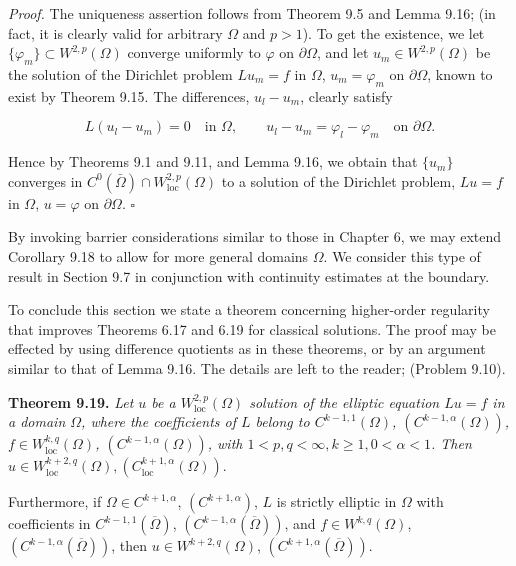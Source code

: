 \textit{Proof.} The uniqueness assertion follows from Theorem 9.5 and Lemma 9.16; (in fact, it is clearly valid for arbitrary $\Omega$ and $p > 1$). To get the existence, we let $\{\varphi_m\} \subset W^{2,p}(\Omega)$ converge uniformly to $\varphi$ on $\partial\Omega$, and let $u_m \in W^{2,p}(\Omega)$ be the solution of the Dirichlet problem $Lu_m = f$ in $\Omega$, $u_m = \varphi_m$ on $\partial\Omega$, known to exist by Theorem 9.15. The differences, $u_l - u_m$, clearly satisfy

\[
L(u_l - u_m) = 0 \quad \text{in } \Omega, \qquad u_l - u_m = \varphi_l - \varphi_m \quad \text{on } \partial\Omega.
\]

Hence by Theorems 9.1 and 9.11, and Lemma 9.16, we obtain that $\{u_m\}$ converges in $C^0(\bar{\Omega}) \cap W^{2,p}_{\mathrm{loc}}(\Omega)$ to a solution of the Dirichlet problem, $Lu = f$ in $\Omega$, $u = \varphi$ on $\partial\Omega$. $\square$

\medskip

By invoking barrier considerations similar to those in Chapter 6, we may extend Corollary 9.18 to allow for more general domains $\Omega$. We consider this type of result in Section 9.7 in conjunction with continuity estimates at the boundary.

To conclude this section we state a theorem concerning higher-order regularity that improves Theorems 6.17 and 6.19 for classical solutions. The proof may be effected by using difference quotients as in these theorems, or by an argument similar to that of Lemma 9.16. The details are left to the reader; (Problem 9.10).

\medskip

\noindent\textbf{Theorem 9.19.} \textit{Let $u$ be a $W^{2,p}_{\mathrm{loc}}(\Omega)$ solution of the elliptic equation $Lu = f$ in a domain $\Omega$, where the coefficients of $L$ belong to $C^{k-1,1}(\Omega)$, $(C^{k-1,\alpha}(\Omega))$, $f \in W^{k,q}_{\mathrm{loc}}(\Omega)$, $(C^{k-1,\alpha}(\Omega))$, with $1 < p, q < \infty, k \geq 1, 0 < \alpha < 1$. Then $u \in W^{k+2,q}_{\mathrm{loc}}(\Omega), (C^{k+1,\alpha}_{\mathrm{loc}}(\Omega)).$}



Furthermore, if $\Omega \in C^{k+1,\alpha}$, $(C^{k+1,\alpha})$, $L$ is strictly elliptic in $\Omega$ with coefficients in $C^{k-1,1}(\overline{\Omega})$, $(C^{k-1,\alpha}(\overline{\Omega}))$, and $f \in W^{k,q}(\Omega)$, $(C^{k-1,\alpha}(\overline{\Omega}))$, then $u \in W^{k+2,q}(\Omega)$, $(C^{k+1,\alpha}(\overline{\Omega}))$.

